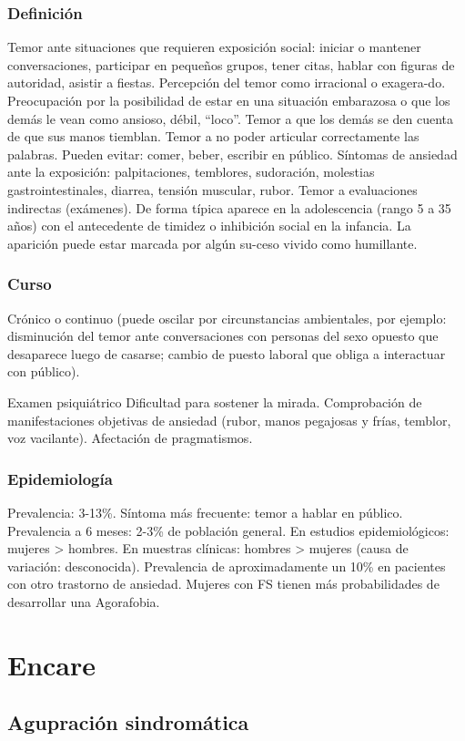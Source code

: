 \documentclass{scrbook}
\begin{document}
\subsubsection*{Definición}
Temor ante situaciones que requieren exposición social: iniciar o mantener conversaciones, participar en pequeños grupos, tener citas, hablar con figuras de autoridad, asistir a fiestas. Percepción del temor como irracional o exagera-do. Preocupación por la posibilidad de estar en una situación embarazosa o que los demás le vean como ansioso, débil, “loco”. Temor a que los demás se den cuenta de que sus manos tiemblan. Temor a no poder articular correctamente las palabras. Pueden evitar: comer, beber, escribir en público. Síntomas de ansiedad ante la exposición: palpitaciones, temblores, sudoración, molestias gastrointestinales, diarrea, tensión muscular, rubor. Temor a evaluaciones indirectas (exámenes). De forma típica aparece en la adolescencia (rango 5 a 35 años) con el antecedente de timidez o inhibición social en la infancia. La aparición puede estar marcada por algún su-ceso vivido como humillante.
\subsubsection*{Curso}
Crónico o continuo (puede oscilar por circunstancias ambientales, por ejemplo: disminución del temor ante conversaciones con personas del sexo opuesto que desaparece luego de casarse; cambio de puesto laboral que obliga a interactuar con público).

Examen psiquiátrico Dificultad para sostener la mirada. Comprobación de manifestaciones objetivas de ansiedad (rubor, manos pegajosas y frías, temblor, voz vacilante). Afectación de pragmatismos.
\subsubsection*{Epidemiología}
Prevalencia: 3-13\%. Síntoma más frecuente: temor a hablar en público. Prevalencia a 6 meses: 2-3\% de población general. En estudios epidemiológicos: mujeres > hombres. En muestras clínicas: hombres > mujeres (causa de variación: desconocida). Prevalencia de aproximadamente un 10\% en pacientes con otro trastorno de ansiedad. Mujeres con FS tienen más probabilidades de desarrollar una Agorafobia.
\section*{Encare}
\subsection*{Agupración sindromática}
\end{document}
